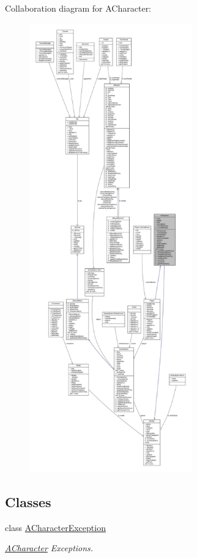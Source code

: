 Collaboration diagram for A\+Character\+:
\nopagebreak
\begin{figure}[H]
\begin{center}
\leavevmode
\includegraphics[height=550pt]{class_a_character__coll__graph}
\end{center}
\end{figure}
\subsection*{Classes}
\begin{DoxyCompactItemize}
\item 
class \hyperlink{class_a_character_1_1_a_character_exception}{A\+Character\+Exception}
\begin{DoxyCompactList}\small\item\em \hyperlink{class_a_character}{A\+Character} Exceptions. \end{DoxyCompactList}\end{DoxyCompactItemize}
